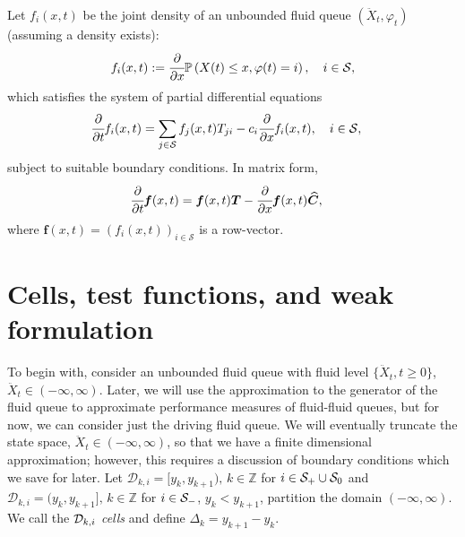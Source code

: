 Let $f_i(x,t)$ be the joint density of an unbounded fluid queue $(\ddot X_t, \varphi_t)$ (assuming a density exists): 
	\begin{align*} 
	    f_i(x,t) := \cfrac{\partial}{\partial x} 	\mathbb{P}\left(X(t) \leq x, \varphi(t) = i\right),\quad i \in\mathcal{S},
	\end{align*} 
which satisfies the system of partial differential equations 
%
\begin{align*}
\cfrac{\partial}{\partial t} f_i(x,t)& = \sum_{j\in \mathcal{S}}  f_j(x,t)T_{ji} - c_i \cfrac{\partial}{\partial x} f_i(x,t), \quad i\in\mathcal S,
\end{align*}
% 
subject to suitable boundary conditions. In matrix form, 
\begin{align}
\cfrac{\partial}{\partial t} \boldsymbol f(x,t) &= \boldsymbol f(x,t)\boldsymbol T -  \cfrac{\partial}{\partial x}\boldsymbol f(x,t)\widehat{\boldsymbol C}\label{eqn:pde_density_matrix}, 
\end{align}
where \(\boldsymbol f(x,t) = \left(f_i(x,t)\right)_{i\in\mathcal S}\) is a row-vector. 

\section{Cells, test functions, and weak formulation}
To begin with, consider an unbounded fluid queue with fluid level \(\{\ddot X_t,t\geq0\}\), \(\ddot X_t\in(-\infty,\infty)\). Later, we will use the approximation to the generator of the fluid queue to approximate performance measures of fluid-fluid queues, but for now, we can consider just the driving fluid queue. We will eventually truncate the state space, \(\ddot X_t\in(-\infty,\infty)\), so that we have a finite dimensional approximation; however, this requires a discussion of boundary conditions which we save for later. Let \(\mathcal D_{k,i} = [y_k,y_{k+1}),\, k\in\mathbb Z\) for \(i\in\mathcal{S}_+\cup\mathcal{S}_0\) and \(\mathcal D_{k,i} = (y_k,y_{k+1}],\, k\in\mathbb Z\) for \(i\in\mathcal{S}_-\), \(y_k<y_{k+1}\), partition the domain \((-\infty,\infty)\). We call the \(\mathcal{D}_{k,i}\) \textit{cells} and define \(\Delta_k=y_{k+1}-y_k\). 


